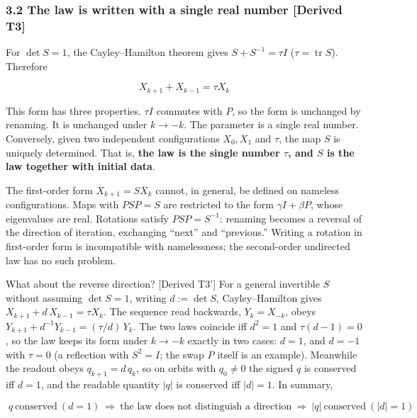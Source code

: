 \documentclass[
  a4paper,
]{article}
\begin{document}
\subsubsection{3.2 The law is written with a single real number
{[}Derived
T3{]}}\label{the-law-is-written-with-a-single-real-number-derived-t3}

For \(\det S=1\), the Cayley--Hamilton theorem gives \(S+S^{-1}=\tau I\)
(\(\tau=\operatorname{tr}S\)). Therefore

\[
\boxed{\;X_{k+1}+X_{k-1}=\tau X_k\;}
\]

This form has three properties. \(\tau I\) commutes with \(P\), so the
form is unchanged by renaming. It is unchanged under \(k\to-k\). The
parameter is a single real number. Conversely, given two independent
configurations \(X_0,X_1\) and \(\tau\), the map \(S\) is uniquely
determined. That is, \textbf{the law is the single number \(\tau\), and
\(S\) is the law together with initial data}.

The first-order form \(X_{k+1}=SX_k\) cannot, in general, be defined on
nameless configurations. Maps with \(PSP=S\) are restricted to the form
\(\gamma I+\beta P\), whose eigenvalues are real. Rotations satisfy
\(PSP=S^{-1}\): renaming becomes a reversal of the direction of
iteration, exchanging ``next'' and ``previous.'' Writing a rotation in
first-order form is incompatible with namelessness; the second-order
undirected law has no such problem.

What about the reverse direction? {[}Derived T3'{]} For a general
invertible \(S\) without assuming \(\det S=1\), writing \(d:=\det S\),
Cayley--Hamilton gives \(X_{k+1}+d\,X_{k-1}=\tau X_k\). The sequence
read backwards, \(Y_k=X_{-k}\), obeys
\(Y_{k+1}+d^{-1}Y_{k-1}=(\tau/d)\,Y_k\). The two laws coincide iff
\(d^2=1\) and \(\tau(d-1)=0\), so the law keeps its form under
\(k\to-k\) exactly in two cases: \(d=1\), and \(d=-1\) with \(\tau=0\)
(a reflection with \(S^2=I\); the swap \(P\) itself is an example).
Meanwhile the readout obeys \(q_{k+1}=d\,q_k\), so on orbits with
\(q_0\neq0\) the signed \(q\) is conserved iff \(d=1\), and the readable
quantity \(\lvert q\rvert\) is conserved iff \(\lvert d\rvert=1\). In
summary,

\[
\boxed{\;q\ \text{conserved}\ (d=1)\ \Longrightarrow\ \text{the law does not distinguish a direction}\ \Longrightarrow\ \lvert q\rvert\ \text{conserved}\ (\lvert d\rvert=1)\;}
\]
\end{document}
